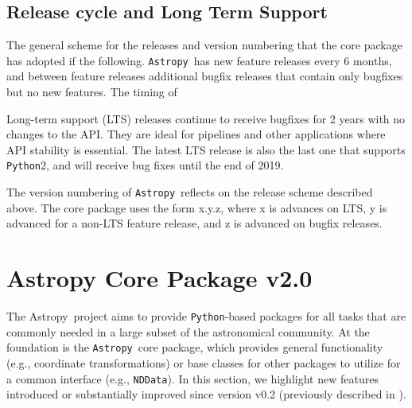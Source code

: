 \documentclass[modern]{aastex61}
\newcommand{\package}[1]{\texttt{#1}}
\newcommand{\python}{\package{Python}}
\newcommand{\astropy}{Astropy}
\newcommand{\astropypkg}{\package{Astropy}}
\newcommand{\inlinecomment}[2]{\todo[inline]{#1: #2}}
\begin{document}
\subsection{Release cycle and Long Term Support}
\par The general scheme for the releases and version numbering that the core
package has adopted if the following. \astropypkg\ has new feature releases every
6 months, and between feature releases additional bugfix releases that
contain only bugfixes but no new features. The timing of
%
\par Long-term support (LTS) releases continue to receive bugfixes for 2
years with no changes to the API. They are ideal for pipelines and other
applications where API stability is essential. The latest LTS release is
also the last one that supports \python 2, and will receive bug fixes until the
end of 2019.
%
\par The version numbering of \astropypkg\ reflects on the release scheme
described above. The core package uses the form x.y.z, where x is advances
on LTS, y is advanced for a non-LTS feature release, and z is advanced on
bugfix releases.


\section{Astropy Core Package v2.0}
\label{sec:core}

The \astropy\ project aims to provide \python-based packages for all tasks that
are commonly needed in a large subset of the astronomical community.
At the foundation is the \astropypkg\ core package, which provides general
functionality (e.g., coordinate transformations) or base classes for other
packages to utilize for a common interface (e.g., \texttt{NDData}).
In this section, we highlight new features introduced or substantially improved
since version v0.2 (previously described in \citealt{astropy}).
\end{document}
